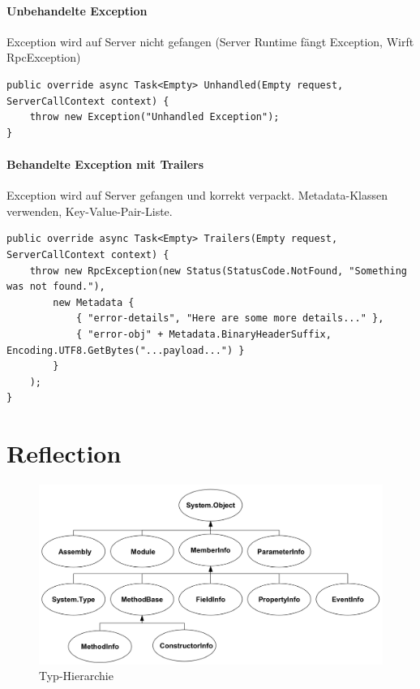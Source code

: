 \documentclass[
a4paper,
oneside,
10pt,
fleqn,
headsepline,
toc=listofnumbered, 
bibliography=totocnumbered]{scrartcl}
\let\stdsection\section
\renewcommand\section{\clearpage\stdsection}
\begin{document}
\paragraph{Unbehandelte Exception} Exception wird auf Server nicht gefangen (Server Runtime fängt Exception, Wirft RpcException)
\begin{lstlisting}
public override async Task<Empty> Unhandled(Empty request, ServerCallContext context) {
    throw new Exception("Unhandled Exception");
}
\end{lstlisting}

\paragraph{Behandelte Exception mit Trailers} Exception wird auf Server gefangen und korrekt verpackt. Metadata-Klassen verwenden, Key-Value-Pair-Liste.
\begin{lstlisting}
public override async Task<Empty> Trailers(Empty request, ServerCallContext context) {
    throw new RpcException(new Status(StatusCode.NotFound, "Something was not found."),
        new Metadata {
            { "error-details", "Here are some more details..." },
            { "error-obj" + Metadata.BinaryHeaderSuffix, Encoding.UTF8.GetBytes("...payload...") }
        }
    );
}
\end{lstlisting}

\section{Reflection}

\begin{figure}[!ht]
	\centering
	\includegraphics[width=0.8\linewidth]{images/member_hierarchie}
	\caption{Typ-Hierarchie}
	\label{fig:valuetypes}
\end{figure}
\end{document}
